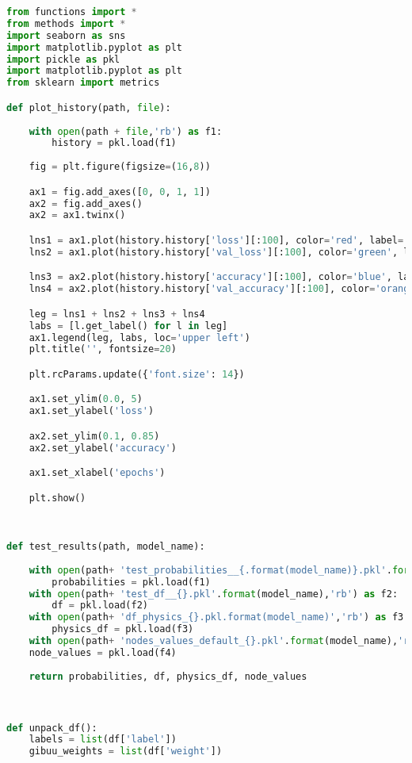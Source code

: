 \begin{lstlisting}[language=Python]
from functions import *
from methods import *
import seaborn as sns
import matplotlib.pyplot as plt
import pickle as pkl
import matplotlib.pyplot as plt
from sklearn import metrics

def plot_history(path, file):
    
    with open(path + file,'rb') as f1:
        history = pkl.load(f1)
        
    fig = plt.figure(figsize=(16,8))

    ax1 = fig.add_axes([0, 0, 1, 1])
    ax2 = fig.add_axes()
    ax2 = ax1.twinx() 

    lns1 = ax1.plot(history.history['loss'][:100], color='red', label='loss')
    lns2 = ax1.plot(history.history['val_loss'][:100], color='green', label='val_loss')

    lns3 = ax2.plot(history.history['accuracy'][:100], color='blue', label='accuracy')
    lns4 = ax2.plot(history.history['val_accuracy'][:100], color='orange', label='val_accuracy')

    leg = lns1 + lns2 + lns3 + lns4
    labs = [l.get_label() for l in leg]
    ax1.legend(leg, labs, loc='upper left')
    plt.title('', fontsize=20)

    plt.rcParams.update({'font.size': 14})

    ax1.set_ylim(0.0, 5)
    ax1.set_ylabel('loss')

    ax2.set_ylim(0.1, 0.85)
    ax2.set_ylabel('accuracy')

    ax1.set_xlabel('epochs')

    plt.show()
    
    

def test_results(path, model_name):
    
    with open(path+ 'test_probabilities__{.format(model_name)}.pkl'.format(model_name),'rb') as f1:
        probabilities = pkl.load(f1)
    with open(path+ 'test_df__{}.pkl'.format(model_name),'rb') as f2:
        df = pkl.load(f2)
    with open(path+ 'df_physics_{}.pkl.format(model_name)','rb') as f3:
        physics_df = pkl.load(f3)
    with open(path+ 'nodes_values_default_{}.pkl'.format(model_name),'rb') as f4:
    node_values = pkl.load(f4)
    
    return probabilities, df, physics_df, node_values



def unpack_df():
    labels = list(df['label'])
    gibuu_weights = list(df['weight'])


\end{lstlisting}
